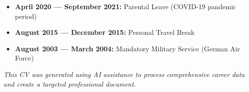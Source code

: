 \documentclass[10pt,a4paper]{article}
\begin{document}
\begin{itemize}
    \item \textbf{April 2020 — September 2021:} Parental Leave (COVID-19 pandemic period)
    \item \textbf{August 2015 — December 2015:} Personal Travel Break
    \item \textbf{August 2003 — March 2004:} Mandatory Military Service (German Air Force)
\end{itemize}

\vspace{12pt}

\begin{center}
\textit{\small This CV was generated using AI assistance to process comprehensive career data and create a targeted professional document.}
\end{center}
\end{document}
